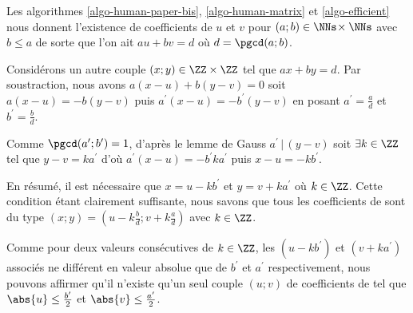 Les algorithmes \ref{algo-human-paper-bis}, \ref{algo-human-matrix} et \ref{algo-efficient} nous donnent l'existence de coefficients de \bb{} $u$ et $v$ pour $(a ; b) \in \NNs \!\times \NNs$ avec $b \leq a$ de sorte que l'on ait $a u + b v = d$ où $d = \pgcd(a ; b)$.


\medskip


Considérons un autre couple $(x ; y) \in \ZZ \times \ZZ$ tel que $a x + b y = d$. Par soustraction, nous avons $a(x - u) + b(y - v) = 0$ soit $a(x - u) = - b(y - v)$ puis $a^\prime(x - u) = - b^\prime(y - v)$ en posant $a^\prime = \frac{a}{d}$ et  $b^\prime = \frac{b}{d}$.


\medskip


Comme $\pgcd(a^\prime ; b^\prime) = 1$, d'après le lemme de Gauss $a^\prime \,|\, (y - v)$ soit $\exists k \in \ZZ$ tel que $y - v = k a^\prime$ d'où $a^\prime(x - u) = - b^\prime k a^\prime$ puis $x - u = - k b^\prime$. 


\medskip


En résumé, il est nécessaire que $x = u - k b^\prime$ et $y = v + k a^\prime$ où $k \in \ZZ$. Cette condition étant clairement suffisante, nous savons que tous les coefficients de \bb{} sont du type $(x ; y) = (u - k \frac{b}{d} ; v + k \frac{a}{d})$ avec $k \in \ZZ$.


\begin{remark}
	Comme pour deux valeurs consécutives de $k \in \ZZ$, les $(u - k b^\prime)$ et $(v + k a^\prime)$ associés ne différent en valeur absolue que de $b^\prime$ et $a^\prime$ respectivement, nous pouvons affirmer qu'il n'existe qu'un seul couple $(u ; v)$ de coefficients de \bb{} tel que $\abs{u} \leq \frac{b^\prime}{2}$ et $\abs{v} \leq \frac{a^\prime}{2}$.
\end{remark}
